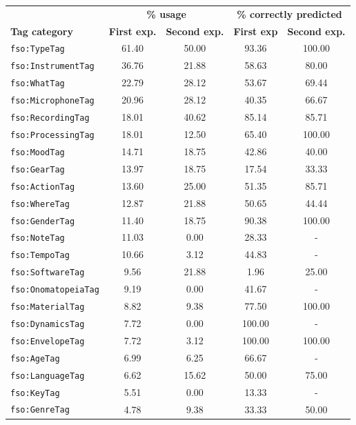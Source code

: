 \begin{table}
\begin{center}
\footnotesize
\begin{tabular}{@{}lcccc@{}}
\toprule
 & \multicolumn{2}{c}{\textbf{\% usage}} & \multicolumn{2}{c}{\textbf{\% correctly predicted}} \\
\textbf{Tag category} & \textbf{First exp.} & \textbf{Second exp.} & \textbf{First exp} & \textbf{Second exp.} \\
\midrule
\texttt{fso:TypeTag} & 61.40 & 50.00 & 93.36 & 100.00 \\
\texttt{fso:InstrumentTag} & 36.76 & 21.88 & 58.63 & 80.00 \\
\texttt{fso:WhatTag} & 22.79 & 28.12 & 53.67 & 69.44 \\
\texttt{fso:MicrophoneTag} & 20.96 & 28.12 & 40.35 & 66.67 \\
\texttt{fso:RecordingTag} & 18.01 & 40.62 & 85.14 & 85.71 \\
\texttt{fso:ProcessingTag} & 18.01 & 12.50 & 65.40 & 100.00 \\
\texttt{fso:MoodTag} & 14.71 & 18.75 & 42.86 & 40.00 \\
\texttt{fso:GearTag} & 13.97 & 18.75 & 17.54 & 33.33 \\
\texttt{fso:ActionTag} & 13.60 & 25.00 & 51.35 & 85.71 \\
\texttt{fso:WhereTag} & 12.87 & 21.88 & 50.65 & 44.44 \\
\texttt{fso:GenderTag} & 11.40 & 18.75 & 90.38 & 100.00 \\
\texttt{fso:NoteTag} & 11.03 & 0.00 & 28.33 & - \\
\texttt{fso:TempoTag} & 10.66 & 3.12 & 44.83 & - \\
\texttt{fso:SoftwareTag} & 9.56 & 21.88 & 1.96 & 25.00 \\
\texttt{fso:OnomatopeiaTag} & 9.19 & 0.00 & 41.67 & - \\
\texttt{fso:MaterialTag} & 8.82 & 9.38 & 77.50 & 100.00 \\
\texttt{fso:DynamicsTag} & 7.72 & 0.00 & 100.00 & - \\
\texttt{fso:EnvelopeTag} & 7.72 & 3.12 & 100.00 & 100.00 \\
\texttt{fso:AgeTag} & 6.99 & 6.25 & 66.67 & - \\
\texttt{fso:LanguageTag} & 6.62 & 15.62 & 50.00 & 75.00 \\
\texttt{fso:KeyTag} & 5.51 & 0.00 & 13.33 & - \\
\texttt{fso:GenreTag} & 4.78 & 9.38 & 33.33 & 50.00 \\

\end{tabular}
\end{center}
\end{table}
